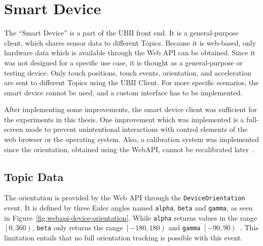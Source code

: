 \section{Smart Device}\label{section:smart-device}

The \enquote{Smart Device} is a part of the \gls{UBII} front end. It is a general-purpose client, which shares sensor data to different Topics. Because it is web-based, only hardware data which is available through the Web \gls{API} can be obtained. Since it was not designed for a specific use case, it is thought as a general-purpose or testing device. Only touch positions, touch events, orientation, and acceleration are sent to different Topics using the \gls{UBII} Client. For more specific scenarios, the smart device cannot be used, and a custom interface has to be implemented.

After implementing some improvements, the smart device client was sufficient for the experiments in this thesis. One improvement which was implemented is a full-screen mode to prevent unintentional interactions with control elements of the web browser or the operating system.
Also, a calibration system was implemented since the orientation, obtained using the Web\gls{API}, cannot be recalibrated later~\cite{DevicesandSensorsWorkingGroup.2019}. 


\subsection{Topic Data}\label{subsection:topic-data}

The orientation is provided by the Web \gls{API} through the \lstinline{DeviceOrientation} event. It is defined by three Euler angles named \lstinline{alpha}, \lstinline{beta} and \lstinline{gamma}, as seen in Figure~\ref{fig:webapi-device-orientation}.
While \lstinline{alpha} returns values in the range \(\left[0, 360\right)\), \lstinline{beta} only returns the range \(\left[-180, 180\right)\) and \lstinline{gamma} \(\left[-90, 90\right)\)~\cite[Chapter~4.1]{DevicesandSensorsWorkingGroup.2019}. %
This limitation entails that no full orientation tracking is possible with this event.

